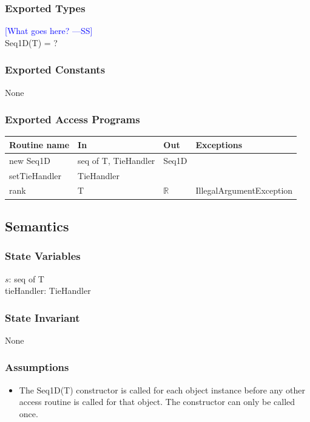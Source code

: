 \documentclass[12pt,fleqn]{examtst}
\newcommand{\authornote}[3]{\textcolor{#1}{[#3 ---#2]}}
\newcommand{\authornote}[3]{}
\newcommand{\wss}[1]{\authornote{blue}{SS}{#1}}
\begin{document}
\subsubsection* {Exported Types}

\wss{What goes here?} \\
Seq1D(T) = ?

\subsubsection* {Exported Constants}

None

\subsubsection* {Exported Access Programs}

\begin{tabular}{| l | l | l | p{6cm} |}
\hline
\textbf{Routine name} & \textbf{In} & \textbf{Out} & \textbf{Exceptions}\\
\hline
new Seq1D & seq of T, TieHandler & Seq1D & \\
\hline
setTieHandler & TieHandler &  & \\
\hline
rank & T & $\mathbb{R}$ & IllegalArgumentException\\
\hline

\end{tabular}

\subsection* {Semantics}

\subsubsection* {State Variables}

$s$: seq of T\\
tieHandler: TieHandler

\subsubsection* {State Invariant}

None

\subsubsection* {Assumptions}

\begin{itemize}
\item The Seq1D(T) constructor is called for each object instance before any
other access routine is called for that object.  The constructor can only be
called once.
\end{itemize}
\end{document}
